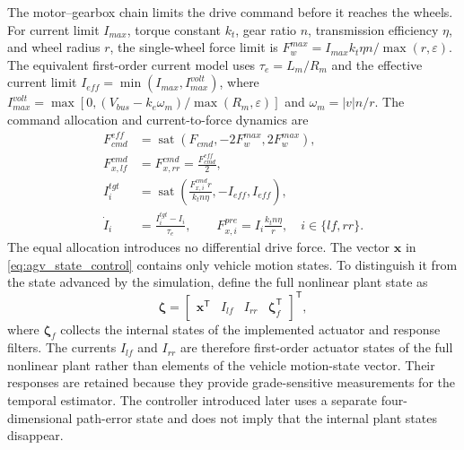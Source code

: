 \documentclass{ieeeaccess}
\begin{document}
The motor--gearbox chain limits the drive command before it reaches the wheels. For current limit $I_{max}$, torque constant $k_t$, gear ratio $n$, transmission efficiency $\eta$, and wheel radius $r$, the single-wheel force limit is $F_w^{max}=I_{max}k_t\eta n/\max(r,\varepsilon)$. The equivalent first-order current model uses $\tau_e=L_m/R_m$ and the effective current limit $I_{eff}=\min(I_{max},I_{max}^{volt})$, where $I_{max}^{volt}=\max[0,(V_{bus}-k_e\omega_m)/\max(R_m,\varepsilon)]$ and $\omega_m=|v|n/r$. The command allocation and current-to-force dynamics are
\begin{equation}
\begin{aligned}
F_{cmd}^{eff}&=\operatorname{sat}\!\left(F_{cmd},-2F_w^{max},2F_w^{max}\right),\\
F_{x,lf}^{cmd}&=F_{x,rr}^{cmd}=\frac{F_{cmd}^{eff}}{2},\\
I_i^{tgt}&=\operatorname{sat}\!\left(\frac{F_{x,i}^{cmd}r}{k_tn\eta},-I_{eff},I_{eff}\right),\\
\dot I_i&=\frac{I_i^{tgt}-I_i}{\tau_e},\qquad
F_{x,i}^{pre}=I_i\frac{k_tn\eta}{r},\quad i\in\{lf,rr\}.
\end{aligned}
\label{eq:agv_drive_actuation}
\end{equation}
The equal allocation introduces no differential drive force. The vector $\bm x$ in \eqref{eq:agv_state_control} contains only vehicle motion states. To distinguish it from the state advanced by the simulation, define the full nonlinear plant state as
\begin{equation}
\bm\zeta=
\begin{bmatrix}
\bm x^{\mathsf T}&I_{lf}&I_{rr}&\bm\zeta_f^{\mathsf T}
\end{bmatrix}^{\mathsf T},
\label{eq:full_nonlinear_state}
\end{equation}
where $\bm\zeta_f$ collects the internal states of the implemented actuator and response filters. The currents $I_{lf}$ and $I_{rr}$ are therefore first-order actuator states of the full nonlinear plant rather than elements of the vehicle motion-state vector. Their responses are retained because they provide grade-sensitive measurements for the temporal estimator. The controller introduced later uses a separate four-dimensional path-error state and does not imply that the internal plant states disappear.
\end{document}
